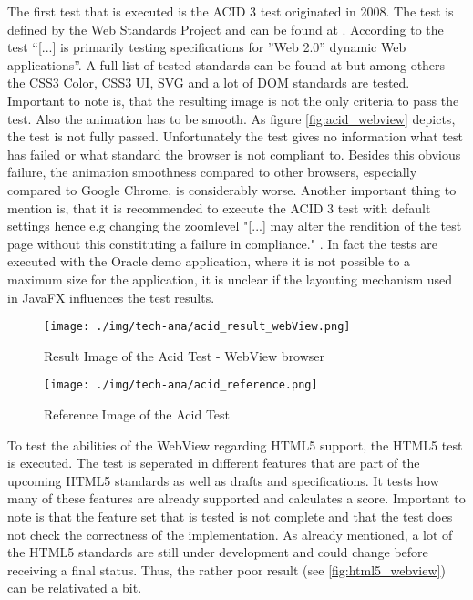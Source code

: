 The first test that is executed is the ACID 3 test originated in 2008.
The test is defined by the Web Standards Project and can be found at \autocite{tech-ana:acid3}.
According to \autocite{tech-ana:acid3} the test \enquote{[...] is primarily testing specifications for ''Web 2.0'' dynamic Web applications}. A full list of tested standards can be found at \autocite{tech-ana:acid3} but among others the CSS3 Color, CSS3 UI, SVG and a lot of DOM standards are tested.
Important to note is, that the resulting image is not the only criteria to pass the test.
Also the animation has to be smooth.
As figure \ref{fig:acid_webview} depicts, the test is not fully passed.
Unfortunately the test gives no information what test has failed or what standard the browser is not compliant to. 
Besides this obvious failure, the animation smoothness compared to other browsers, especially compared to Google Chrome, is considerably worse.
Another important thing to mention is, that it is recommended to execute the ACID 3 test with default settings hence e.g changing the zoomlevel "[...] may alter the rendition of the test page without this constituting a failure in compliance." \autocite{tech-ana:acid3}. 
In fact the tests are executed with the Oracle demo application, where it is not possible to a maximum size  for the application, it is unclear if the layouting mechanism used in JavaFX influences the test results.

\begin{figure}
\begin{minipage}[t]{7cm}
	\centering
	\texttt{[image: ./img/tech-ana/acid\_result\_webView.png]}
	\caption{Result Image of the Acid Test - WebView browser}
	\label{fig:acid_webview}
\end{minipage}
\hfill
\begin{minipage}[t]{7cm}
	\centering
	\texttt{[image: ./img/tech-ana/acid\_reference.png]}
	\caption{Reference Image of the Acid Test}
	\label{fig:acid_reference}
\end{minipage}
\end{figure}


To test the abilities of the WebView regarding HTML5 support, the HTML5 test \autocite{tech-ana:html5-test} is executed.
The test is seperated in different features that are part of the upcoming HTML5 standards as well as drafts and specifications.
It tests how many of these features are already supported and calculates a score.
Important to note is that the feature set that is tested is not complete and that the test does not check the correctness of the implementation.
As already mentioned, a lot of the HTML5 standards are still under development and could change before receiving a final status.
Thus, the rather poor result (see \ref{fig:html5_webview}) can be relativated a bit.

